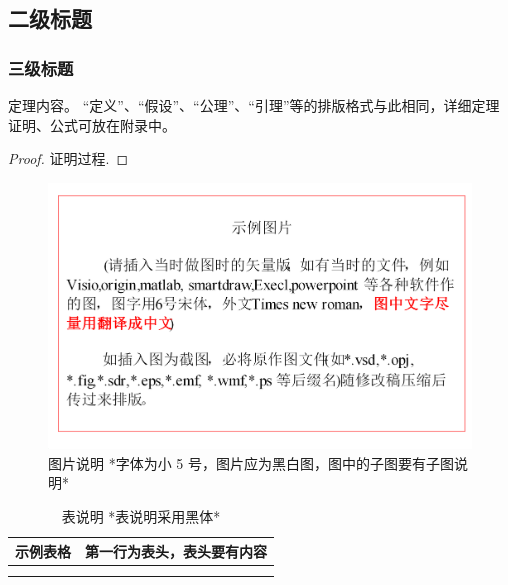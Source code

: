 \documentclass{cjc}
\begin{document}
\subsection{二级标题}

\subsubsection{三级标题}

\begin{theorem}
  定理内容。
  “定义”、“假设”、“公理”、“引理”等的排版格式与此相同，详细定理证明、公式可放在附录中。
\end{theorem}

\begin{proof}
  证明过程.
\end{proof}

\begin{figure}[htb]
  \centering
  \includegraphics[width=\linewidth]{example-fig.pdf}
  \caption{图片说明 *字体为小 5 号，图片应为黑白图，图中的子图要有子图说明*}
\end{figure}

\begin{table}[htb]
  \centering
  \caption{表说明 *表说明采用黑体*}
  \small
  \begin{tabular}{cc}
    \toprule
    示例表格 & 第一行为表头，表头要有内容 \\
    \midrule
             &                            \\
    \midrule
             &                            \\
    \bottomrule
  \end{tabular}
\end{table}

\end{document}
